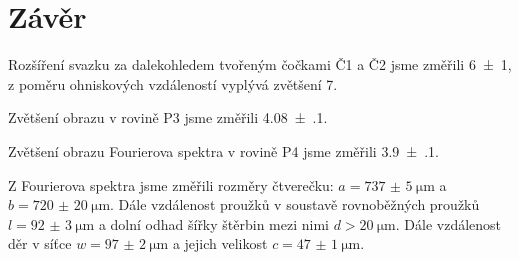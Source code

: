 \section*{Závěr}
Rozšíření svazku za dalekohledem tvořeným čočkami Č1 a Č2 jsme změřili \num{6(1)}, z poměru ohniskových vzdáleností vyplývá zvětšení 7.

Zvětšení obrazu v rovině P3 jsme změřili \num{4.08(10)}.

Zvětšení obrazu Fourierova spektra v rovině P4 jsme změřili \num{3.9(1)}.

Z Fourierova spektra jsme změřili rozměry čtverečku: $a=\SI{737(5)}{\micro\meter}$ a $b=\SI{720(20)}{\micro\metre}$. Dále vzdálenost proužků v soustavě rovnoběžných proužků $l=\SI{92(3)}{\micro\metre}$ a dolní odhad šířky štěrbin mezi nimi $d>\SI{20}{\micro\metre}$. Dále vzdálenost děr v síťce $w=\SI{97(2)}{\micro\metre}$ a jejich velikost $c=\SI{47(1)}{\micro\metre}$.

